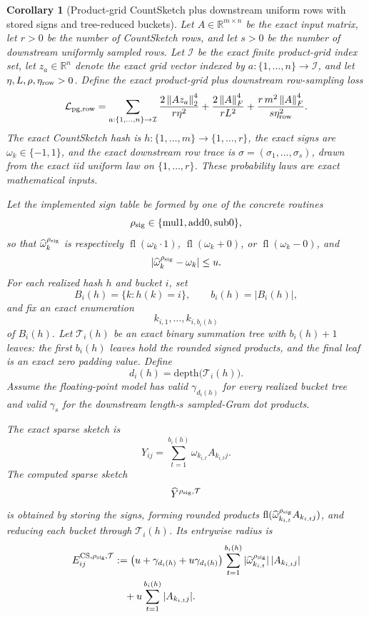 \documentclass[11pt]{article}
\newcommand{\R}{\mathbb{R}}
\newcommand{\Frob}[1]{\left\lVert #1\right\rVert_F}
\newcommand{\Norm}[1]{\left\lVert #1\right\rVert_2}
\newcommand{\fl}{\operatorname{fl}}
\newtheorem{corollary}[theorem]{Corollary}
\theoremstyle{remark}
\begin{document}
\begin{corollary}[Product-grid CountSketch plus downstream uniform rows with stored signs and tree-reduced buckets]
Let \(A\in\R^{m\times n}\) be the exact input matrix, let \(r>0\) be the
number of CountSketch rows, and let \(s>0\) be the number of downstream
uniformly sampled rows.  Let \(\mathcal I\) be the exact finite product-grid
index set, let \(z_a\in\R^n\) denote the exact grid vector indexed by
\(a:\{1,\ldots,n\}\to\mathcal I\), and let
\(\eta,L,\rho,\eta_{\rm row}>0\).  Define the exact product-grid plus
downstream row-sampling loss
\[
  \mathcal L_{\rm pg,row}
  =
  \sum_{a:\{1,\ldots,n\}\to\mathcal I}
    \frac{2\Norm{Az_a}^4}{r\eta^2}
  +
    \frac{2\Frob{A}^4}{rL^2}
  +
    \frac{r\,m^2\Frob{A}^4}{s\eta_{\rm row}^2}.
\]
The exact CountSketch hash is \(h:\{1,\ldots,m\}\to\{1,\ldots,r\}\), the
exact signs are \(\omega_k\in\{-1,1\}\), and the exact downstream row trace is
\(\sigma=(\sigma_1,\ldots,\sigma_s)\), drawn from the exact iid uniform law on
\(\{1,\ldots,r\}\).  These probability laws are exact mathematical inputs.

Let the implemented sign table be formed by one of the concrete routines
\[
  \rho_{\rm sig}\in\{\mathrm{mul1},\mathrm{add0},\mathrm{sub0}\},
\]
so that \(\widehat\omega_k^{\rho_{\rm sig}}\) is respectively
\(\fl(\omega_k\cdot1)\), \(\fl(\omega_k+0)\), or \(\fl(\omega_k-0)\), and
\[
  |\widehat\omega_k^{\rho_{\rm sig}}-\omega_k|\le u.
\]
For each realized hash \(h\) and bucket \(i\), set
\[
  B_i(h)=\{k:h(k)=i\},
  \qquad
  b_i(h)=|B_i(h)|,
\]
and fix an exact enumeration
\[
  k_{i,1},\ldots,k_{i,b_i(h)}
\]
of \(B_i(h)\).  Let \(\mathcal T_i(h)\) be an exact binary summation tree with
\(b_i(h)+1\) leaves: the first \(b_i(h)\) leaves hold the rounded signed
products, and the final leaf is an exact zero padding value.  Define
\[
  d_i(h)=\mathrm{depth}\bigl(\mathcal T_i(h)\bigr).
\]
Assume the floating-point model has valid \(\gamma_{d_i(h)}\) for every
realized bucket tree and valid \(\gamma_s\) for the downstream length-\(s\)
sampled-Gram dot products.

The exact sparse sketch is
\[
  Y_{ij}
  =
  \sum_{t=1}^{b_i(h)}
    \omega_{k_{i,t}}A_{k_{i,t}j}.
\]
The computed sparse sketch
\[
  \widehat Y^{\rho_{\rm sig},\mathcal T}
\]
is obtained by storing the signs, forming rounded products
\(\fl(\widehat\omega_{k_{i,t}}^{\rho_{\rm sig}}A_{k_{i,t}j})\), and reducing
each bucket through \(\mathcal T_i(h)\).  Its entrywise radius is
\[
\begin{aligned}
  E^{{\rm CS},\rho_{\rm sig},\mathcal T}_{ij}
  &:=
  \bigl(u+\gamma_{d_i(h)}+u\gamma_{d_i(h)}\bigr)
  \sum_{t=1}^{b_i(h)}
    |\widehat\omega^{\rho_{\rm sig}}_{k_{i,t}}|\,|A_{k_{i,t}j}|
\\
  &\quad+
  u\sum_{t=1}^{b_i(h)}|A_{k_{i,t}j}|.
\end{aligned}
\]


\end{corollary}
\end{document}
